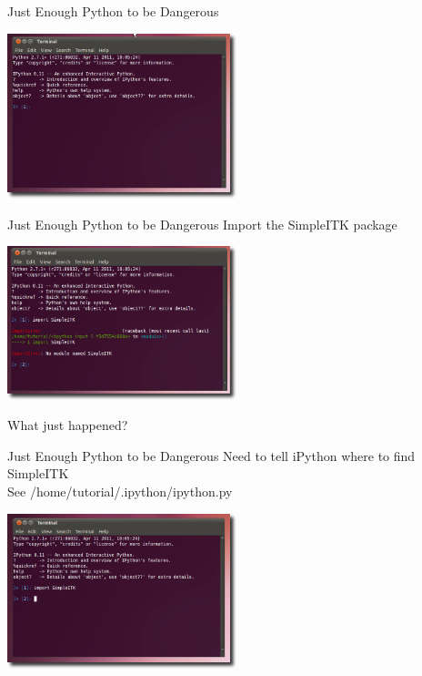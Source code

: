 \begin{frame}{Just Enough Python to be Dangerous}
\begin{center}
  \includegraphics[width=0.5\textwidth]{Images/iPythonWindow_shadow}
\end{center}
\end{frame}

\begin{frame}{Just Enough Python to be Dangerous}
Import the SimpleITK package
\begin{center}
  \includegraphics[width=0.5\textwidth]{Images/iPythonImportError_shadow}
\end{center}
What just happened?
\end{frame}

\begin{frame}{Just Enough Python to be Dangerous}
Need to tell iPython where to find SimpleITK\\
See /home/tutorial/.ipython/ipython.py
\begin{center}
  \includegraphics[width=0.5\textwidth]{Images/iPythonWithSimpleITK_shadow}
\end{center}
\end{frame}

